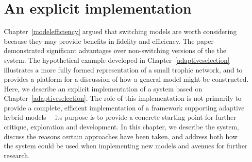\newcommand{\mclasses}[1]{\texttt{<#1>s}\xspace}
\newcommand{\mproxies}{\textit{proxies}\xspace}
\newcommand{\magents}{\textit{agents}\xspace}
\newcommand{\marrays}{\textit{arrays}\xspace}
\newcommand{\mprojections}{\textit{projections}\xspace} %
\newcommand{\mplottableagents}{\textit{plottable-agents}\xspace} %
\newcommand{\mthings}{\textit{things}\xspace} %
\newcommand{\mlivingthings}{\textit{living-things}\xspace} %
\newcommand{\manimals}{\textit{animals}\xspace} %
\newcommand{\mplants}{\textit{plants}\xspace} %
\newcommand{\mplantarrays}{\textit{plant-arrays}\xspace} %
\newcommand{\menvs}{\textit{environments}\xspace} %
\newcommand{\mpatches}{\textit{patches}\xspace} %
\newcommand{\mdynamicpatches}{\textit{dynamic-patches}\xspace} %
\newcommand{\mservices}{\textit{ecoservices}\xspace} %
\newcommand{\mlandscapes}{\textit{landscapes}\xspace} %
\newcommand{\mloggers}{\textit{loggers}\xspace} %
\newcommand{\mmonitors}{\textit{monitors}\xspace} %

\chapter[AN EXPLICIT IMPLEMENTATION]{An explicit implementation}
\WeAreOn{\cfive}\label{explicitmodel}


Chapter~\ref{modelefficiency} argued that switching models are worth
considering because they may provide benefits in fidelity and
efficiency. The paper demonstrated significant advantages over
non-switching versions of the the system.  The hypothetical example
developed in Chapter~\ref{adaptiveselection} illustrates a more fully
formed representation of a small trophic network, and to provides a
platform for a discussion of how a general model might be
constructed. Here, we describe an explicit implementation of a system
based on Chapter~\ref{adaptiveselection}. The role of this
implementation is not primarily to provide a complete, efficient
implementation of a framework supporting adaptive hybrid models--- its
purpose is to provide a concrete starting point for further critique,
exploration and development.  In this chapter, we describe the system,
discuss the reasons certain approaches have been taken, and address
both how the system could be used when implementing new models and
avenues for further research.

